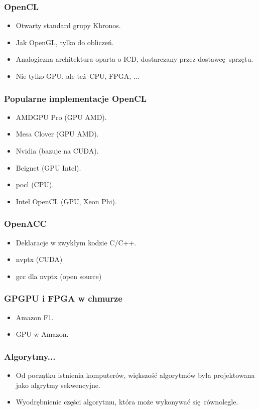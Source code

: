 \documentclass[dvipsnames,table]{beamer}
\begin{document}
\begin{frame}
	\frametitle{OpenCL}
\begin{itemize}
	\item Otwarty standard grupy Khronos.
	\item Jak OpenGL, tylko do obliczeń.
	\item Analogiczna architektura oparta o ICD, dostarczany przez dostawcę sprzętu.
	\item Nie tylko GPU, ale też CPU, FPGA, ...
\end{itemize}
\end{frame}


\begin{frame}
	\frametitle{Popularne implementacje OpenCL}
\begin{itemize}
	\item AMDGPU Pro (GPU AMD).
	\item Mesa Clover (GPU AMD).
	\item Nvidia (bazuje na CUDA).
	\item Beignet (GPU Intel).
	\item pocl (CPU).
	\item Intel OpenCL (GPU, Xeon Phi).
\end{itemize}
\end{frame}

\begin{frame}
	\frametitle{OpenACC}
\begin{itemize}
	\item Deklaracje w zwykłym kodzie C/C++.
	\item nvptx (CUDA)
	\item gcc dla nvptx (open source)
\end{itemize}
\end{frame}

\begin{frame}
	\frametitle{GPGPU i FPGA w chmurze}
\begin{itemize}
	\item Amazon F1.
	\item GPU w Amazon.
\end{itemize}
\end{frame}

\begin{frame}
	\frametitle{Algorytmy...}
\begin{itemize}
	\item Od początku istnienia komputerów, większość algorytmów była projektowana jako algrytmy sekwencyjne.
	\item Wyodrębnienie części algorytmu, która może wykonywać się równolegle.
\end{itemize}
\end{frame}
\end{document}
